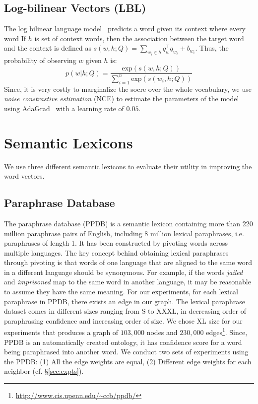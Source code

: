 \documentclass[11pt]{article}
\begin{document}
\subsection{Log-bilinear Vectors (LBL)}
\label{sec:lbl}

The log bilinear language model~\cite{MnihTeh2012} predicts a word given its
context where every word 
If $h$ is set of context words, then the association between the target word 
and the context is defined
as $s(w, h;Q) = \sum_{w_i \in h}q_{w}^{\top}q_{w_{i}} + b_{w_{i}}$. Thus, the probability of observing $w$ given $h$ is:
\begin{equation}
  \label{equ:prob-lbl}
  p(w|h;Q) = \frac{\text{exp}(s(w, h;Q))}{\sum_{i=1}^{n}\text{exp}(s(w_{i}, h;Q))}
\end{equation}
Since, it is very costly to marginalize the socre over the whole vocabulary, 
we use \textit{noise constrastive estimation} (NCE) to estimate the parameters 
of the model~\cite{MnihTeh2012} using AdaGrad~\cite{Duchi:EECS-2010-24} with a 
learning rate of $0.05$.

\section{Semantic Lexicons}
\label{sec:lexicons}

We use three different semantic lexicons to evaluate their utility in improving
the word vectors.

\subsection{Paraphrase Database} 
\label{sec:ppdb}

The paraphrase database (PPDB) \cite{ganitkevitch2013ppdb} is a semantic lexicon containing more than 220 million paraphrase pairs of English, including 8 million lexical paraphrases, i.e. paraphrases of length 1. It has been constructed by pivoting words across multiple languages. The key concept behind obtaining lexical paraphrases through pivoting is that words of one language that are aligned to the same word in a different language should be synonymous. For example, if the words \textit{jailed} and \textit{imprisoned} map to the same word in another language, it may be reasonable to assume they have the same meaning. For our experiments, for each lexical paraphrase in PPDB, there exists an edge in our graph. The lexical paraphrase dataset comes in different sizes ranging from S to XXXL, in decreasing order of paraphrasing confidence and increasing order of size. We chose XL size for our experiments that produces a graph of $103,000$ nodes and $230,000$ edges\footnote{\url{http://www.cis.upenn.edu/~ccb/ppdb/}}.
Since, PPDB is an automatically created ontology, it has confidence score for a word being 
paraphrased into another word. We conduct two sets of 
experiments using the 
PPDB: (1) All the edge weights are equal, (2) Different edge weights for each neighbor (cf. \S\ref{sec:expts}). 
\end{document}
